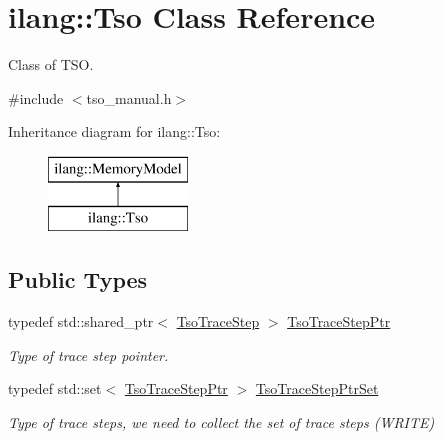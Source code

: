 \hypertarget{classilang_1_1_tso}{}\section{ilang\+:\+:Tso Class Reference}
\label{classilang_1_1_tso}


Class of T\+SO.  




{\ttfamily \#include $<$tso\+\_\+manual.\+h$>$}

Inheritance diagram for ilang\+:\+:Tso\+:\begin{figure}[H]
\begin{center}
\leavevmode
\includegraphics[height=2.000000cm]{classilang_1_1_tso}
\end{center}
\end{figure}
\subsection*{Public Types}
\begin{DoxyCompactItemize}
\item 
\mbox{\label{classilang_1_1_tso_ac98cf74e5ddad20b672679cca77e3560}} 
typedef std\+::shared\+\_\+ptr$<$ \mbox{\hyperlink{classilang_1_1_tso_trace_step}{Tso\+Trace\+Step}} $>$ \mbox{\hyperlink{classilang_1_1_tso_ac98cf74e5ddad20b672679cca77e3560}{Tso\+Trace\+Step\+Ptr}}
\begin{DoxyCompactList}\small\item\em Type of trace step pointer. \end{DoxyCompactList}\item 
\mbox{\label{classilang_1_1_tso_af9a3c9f62377597e9fb0771d5301f404}} 
typedef std\+::set$<$ \mbox{\hyperlink{classilang_1_1_tso_ac98cf74e5ddad20b672679cca77e3560}{Tso\+Trace\+Step\+Ptr}} $>$ \mbox{\hyperlink{classilang_1_1_tso_af9a3c9f62377597e9fb0771d5301f404}{Tso\+Trace\+Step\+Ptr\+Set}}
\begin{DoxyCompactList}\small\item\em Type of trace steps, we need to collect the set of trace steps (W\+R\+I\+TE) \end{DoxyCompactList}\end{DoxyCompactItemize}
